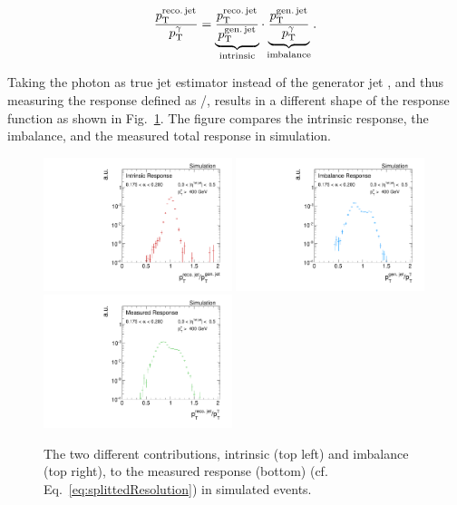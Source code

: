 \begin{equation}\label{eq:splittedResolution}
\frac{{p}_\mathrm{T}^{\text{reco.\,jet}}}{{p}_\mathrm{T}^{\gamma}} = \underbrace{\frac{{p}_\mathrm{T}^{\text{reco.\,jet}}}{{p}_\mathrm{T}^{\text{gen.\,jet}}}}_{\text{intrinsic}} \cdot \underbrace{\frac{{p}_\mathrm{T}^{\text{gen.\,jet}}}{{p}_\mathrm{T}^{\gamma}}}_{\text{imbalance}}.
\end{equation}

Taking the photon \pt as true jet \pt estimator instead of the generator jet \pt, and thus measuring the response defined as \ptrecojet/\ptgamma, results in a different shape of the response function as shown in Fig.~\ref{fig:responseExamples}. 
The figure compares the intrinsic response, the imbalance, and the measured total response in simulation. 

\begin{figure}[t]
 \centering
     \includegraphics[width=0.49\textwidth]{figures/resolution/methodology/intrinsicResponse_6_alpha_bin.pdf}
     \includegraphics[width=0.49\textwidth]{figures/resolution/methodology/imbalanceResponse_6_alpha_bin.pdf}\\
     \includegraphics[width=0.49\textwidth]{figures/resolution/methodology/fullResponse_6_alpha_bin.pdf}
  \caption{The two different contributions, intrinsic (top left) and imbalance (top right), to the measured response (bottom) (cf. Eq.~\eqref{eq:splittedResolution}) in simulated events.}  
 \label{fig:responseExamples}
\end{figure}


